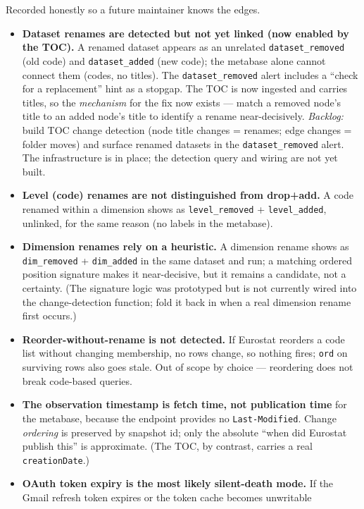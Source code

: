 \documentclass[
]{article}
\begin{document}
Recorded honestly so a future maintainer knows the edges.

\begin{itemize}
\item
  \textbf{Dataset renames are detected but not yet linked (now enabled
  by the TOC).} A renamed dataset appears as an unrelated
  \texttt{dataset\_removed} (old code) and \texttt{dataset\_added} (new
  code); the metabase alone cannot connect them (codes, no titles). The
  \texttt{dataset\_removed} alert includes a ``check for a replacement''
  hint as a stopgap. The TOC is now ingested and carries titles, so the
  \emph{mechanism} for the fix now exists --- match a removed node's
  title to an added node's title to identify a rename near-decisively.
  \emph{Backlog:} build TOC change detection (node title changes =
  renames; edge changes = folder moves) and surface renamed datasets in
  the \texttt{dataset\_removed} alert. The infrastructure is in place;
  the detection query and wiring are not yet built.
\item
  \textbf{Level (code) renames are not distinguished from drop+add.} A
  code renamed within a dimension shows as \texttt{level\_removed} +
  \texttt{level\_added}, unlinked, for the same reason (no labels in the
  metabase).
\item
  \textbf{Dimension renames rely on a heuristic.} A dimension rename
  shows as \texttt{dim\_removed} + \texttt{dim\_added} in the same
  dataset and run; a matching ordered position signature makes it
  near-decisive, but it remains a candidate, not a certainty. (The
  signature logic was prototyped but is not currently wired into the
  change-detection function; fold it back in when a real dimension
  rename first occurs.)
\item
  \textbf{Reorder-without-rename is not detected.} If Eurostat reorders
  a code list without changing membership, no rows change, so nothing
  fires; \texttt{ord} on surviving rows also goes stale. Out of scope by
  choice --- reordering does not break code-based queries.
\item
  \textbf{The observation timestamp is fetch time, not publication time}
  for the metabase, because the endpoint provides no
  \texttt{Last-Modified}. Change \emph{ordering} is preserved by
  snapshot id; only the absolute ``when did Eurostat publish this'' is
  approximate. (The TOC, by contrast, carries a real
  \texttt{creationDate}.)
\item
  \textbf{OAuth token expiry is the most likely silent-death mode.} If
  the Gmail refresh token expires or the token cache becomes unwritable

\end{itemize}
\end{document}
